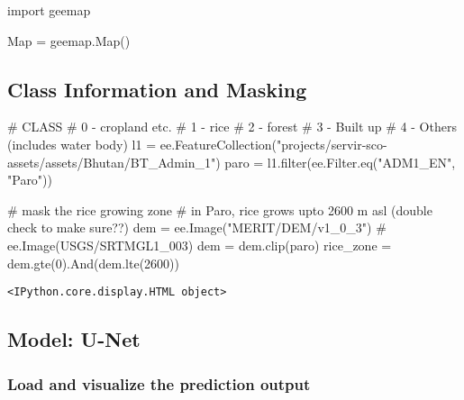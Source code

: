\documentclass[
  letterpaper,
  DIV=11,
  numbers=noendperiod]{scrreprt}
\newenvironment{Shaded}{\begin{snugshade}}{\end{snugshade}}
\newcommand{\BuiltInTok}[1]{\textcolor[rgb]{0.00,0.23,0.31}{#1}}
\newcommand{\CommentTok}[1]{\textcolor[rgb]{0.37,0.37,0.37}{#1}}
\newcommand{\DecValTok}[1]{\textcolor[rgb]{0.68,0.00,0.00}{#1}}
\newcommand{\ImportTok}[1]{\textcolor[rgb]{0.00,0.46,0.62}{#1}}
\newcommand{\NormalTok}[1]{\textcolor[rgb]{0.00,0.23,0.31}{#1}}
\newcommand{\OperatorTok}[1]{\textcolor[rgb]{0.37,0.37,0.37}{#1}}
\newcommand{\StringTok}[1]{\textcolor[rgb]{0.13,0.47,0.30}{#1}}
\begin{document}
\begin{Shaded}
\begin{Highlighting}[]
\ImportTok{import}\NormalTok{ geemap}

\NormalTok{Map }\OperatorTok{=}\NormalTok{ geemap.Map()}
\end{Highlighting}
\end{Shaded}

\subsection{Class Information and
Masking}\label{class-information-and-masking}

\begin{Shaded}
\begin{Highlighting}[]
\CommentTok{\# CLASS}
\CommentTok{\# 0 {-} cropland etc.}
\CommentTok{\# 1 {-} rice}
\CommentTok{\# 2 {-} forest}
\CommentTok{\# 3 {-} Built up}
\CommentTok{\# 4 {-} Others (includes water body)}
\NormalTok{l1 }\OperatorTok{=}\NormalTok{ ee.FeatureCollection(}\StringTok{"projects/servir{-}sco{-}assets/assets/Bhutan/BT\_Admin\_1"}\NormalTok{)}
\NormalTok{paro }\OperatorTok{=}\NormalTok{ l1.}\BuiltInTok{filter}\NormalTok{(ee.Filter.eq(}\StringTok{"ADM1\_EN"}\NormalTok{, }\StringTok{"Paro"}\NormalTok{))}


\CommentTok{\# mask the rice growing zone}
\CommentTok{\# in Paro, rice grows upto 2600 m asl (double check to make sure??)}
\NormalTok{dem }\OperatorTok{=}\NormalTok{ ee.Image(}\StringTok{"MERIT/DEM/v1\_0\_3"}\NormalTok{) }\CommentTok{\# ee.Image(\textquotesingle{}USGS/SRTMGL1\_003\textquotesingle{})}
\NormalTok{dem }\OperatorTok{=}\NormalTok{ dem.clip(paro)}
\NormalTok{rice\_zone }\OperatorTok{=}\NormalTok{ dem.gte(}\DecValTok{0}\NormalTok{).And(dem.lte(}\DecValTok{2600}\NormalTok{))}
\end{Highlighting}
\end{Shaded}

\begin{verbatim}
<IPython.core.display.HTML object>
\end{verbatim}

\subsection{Model: U-Net}\label{model-u-net}

\subsubsection{Load and visualize the prediction
output}\label{load-and-visualize-the-prediction-output}
\end{document}
